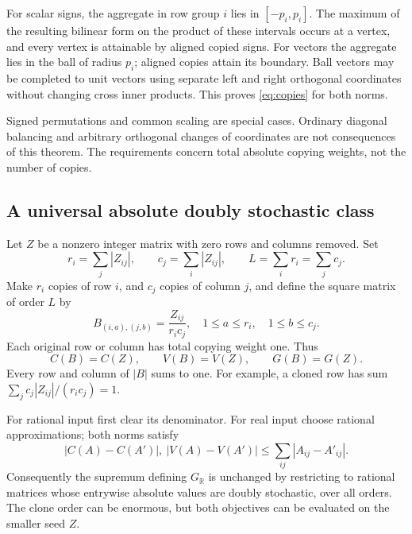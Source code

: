 \documentclass[11pt]{article}
\newcommand{\R}{\mathbb R}
\newcommand{\GR}{G_{\R}}
\begin{document}
For scalar signs, the aggregate in row group $i$ lies in
$[-p_i,p_i]$. The maximum of the resulting bilinear form on the product
of these intervals occurs at a vertex, and every vertex is attainable
by aligned copied signs. For vectors the aggregate lies in the ball of
radius $p_i$; aligned copies attain its boundary. Ball vectors may be
completed to unit vectors using separate left and right orthogonal
coordinates without changing cross inner products. This proves
\eqref{eq:copies} for both norms.

Signed permutations and common scaling are special cases. Ordinary
diagonal balancing and arbitrary orthogonal changes of coordinates are
not consequences of this theorem. The requirements concern total
absolute copying weights, not the number of copies.

\subsection{A universal absolute doubly stochastic class}
Let $Z$ be a nonzero integer matrix with zero rows and columns removed.
Set
\[
 r_i=\sum_j|Z_{ij}|,\qquad c_j=\sum_i|Z_{ij}|,
 \qquad L=\sum_i r_i=\sum_jc_j.
\]
Make $r_i$ copies of row $i$, and $c_j$ copies of column $j$, and define
the square matrix of order $L$ by
\begin{equation}\label{eq:clone}
 \boxed{\quad B_{(i,a),(j,b)}=\frac{Z_{ij}}{r_ic_j},
 \quad 1\le a\le r_i,\quad1\le b\le c_j.\quad}
\end{equation}
Each original row or column has total copying weight one. Thus
\begin{equation}\label{eq:clone-norm}
 C(B)=C(Z),\qquad V(B)=V(Z),\qquad G(B)=G(Z).
\end{equation}
Every row and column of $|B|$ sums to one. For example, a cloned row
has sum $\sum_jc_j|Z_{ij}|/(r_ic_j)=1$.

For rational input first clear its denominator. For real input choose
rational approximations; both norms satisfy
\begin{equation}\label{eq:lipschitz}
 |C(A)-C(A')|,\ |V(A)-V(A')|
                 \le\sum_{ij}|A_{ij}-A'_{ij}|.
\end{equation}
Consequently the supremum defining $\GR$ is unchanged by restricting
to rational matrices whose entrywise absolute values are doubly stochastic,
over all orders. The clone order can be enormous, but both objectives
can be evaluated on the smaller seed $Z$.
\end{document}
